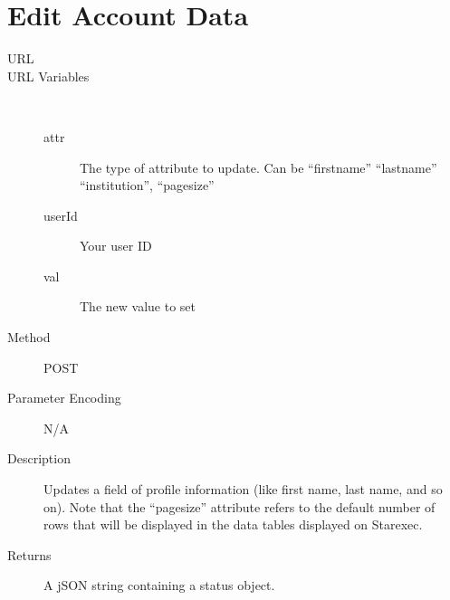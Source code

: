 \section{Edit Account Data}
\begin{description}
\item [URL] 
\item [URL Variables] \
	\begin{description}
	\item [attr]  The type of attribute to update. Can be “firstname” “lastname” “institution”, “pagesize”
	\item [userId] \type{Integer} Your user ID
	\item [val]  The new value to set
	\end{description}
\item [Method] POST
\item [Parameter Encoding] N/A
\item [Description] Updates a field of profile information (like first name, last name, and so on). Note that the “pagesize” attribute refers to the default number of rows that will be displayed in the data tables displayed on Starexec.
\item [Returns] A jSON string containing a status object.
\end{description}


